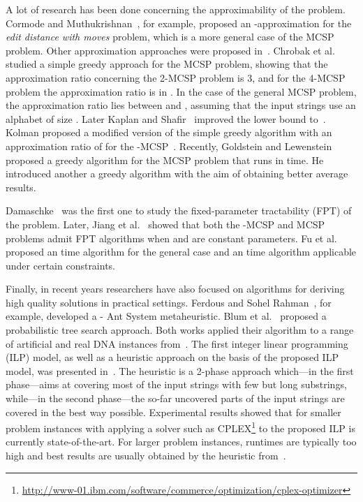 \documentclass[11pt,a4paper]{article}
\begin{document}
A lot of research has been done concerning the approximability of the
problem. Cormode and Muthukrishnan~\cite{Cormode2002}, for example,
proposed an -approximation for the \emph{edit distance
with moves} problem, which is a more general case of the MCSP problem.
Other approximation approaches were proposed
in~\cite{Shapira2002,Kolman2007}. Chrobak et al.~\cite{Chrobak2004}
studied a simple greedy approach for the MCSP problem, showing that the
approximation ratio concerning the 2-MCSP problem is 3, and for the
4-MCSP problem the approximation ratio is in . In the case
of the general MCSP problem, the approximation ratio lies between
 and , assuming that the input strings
use an alphabet of size . Later Kaplan and
Shafir~\cite{Kaplan2006} improved the lower bound to~.
Kolman proposed a modified version of the simple greedy algorithm with
an approximation ratio of  for the -MCSP~\cite{Kolman2005}.
Recently, Goldstein and Lewenstein~\cite{Goldstein2011} proposed a
greedy algorithm for the MCSP problem that runs in  time.
He~\cite{He2007} introduced another a greedy algorithm with the aim of
obtaining better average results.

Damaschke~\cite{raey} was the first one to study the fixed-parameter
tractability (FPT) of the problem. Later, Jiang et al.~\cite{Jiang2010}
showed that both the -MCSP and MCSP problems admit FPT algorithms
when  and  are constant parameters. Fu et al.~\cite{BinFu2011}
proposed an  time algorithm for the general case and an
 time algorithm applicable under certain constraints. 

Finally, in recent years researchers have also focused on algorithms for
deriving high quality solutions in practical settings. Ferdous and Sohel
Rahman~\cite{Ferdous2013,FerRah14:arxiv}, for example, developed a
{}-{} {A}nt {S}ystem metaheuristic. Blum et
al.~\cite{BluEtAl14:hm} proposed a probabilistic tree search approach.
Both works applied their algorithm to a range of artificial and real DNA
instances from~\cite{Ferdous2013}. The first integer linear programming
(ILP) model, as well as a heuristic approach on the basis of the
proposed ILP model, was presented in~\cite{BluEtAl15:ejor}. The heuristic is a 2-phase approach which---in the first phase---aims at covering most of the input strings with few but long substrings, while---in the second phase---the so-far uncovered parts of the input strings are covered in the best way possible. 
Experimental results showed that for smaller problem instances with  
applying a solver such as
CPLEX\footnote{\url{http://www-01.ibm.com/software/commerce/optimization/cplex-optimizer}}
to the proposed ILP is currently state-of-the-art. 
For larger problem instances, runtimes are typically too high and 
best results are usually obtained by the heuristic from~\cite{BluEtAl15:ejor}. 
\end{document}
